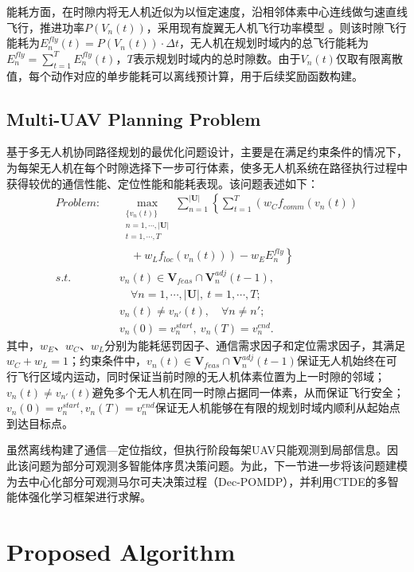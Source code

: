 \documentclass[lettersize,journal]{IEEEtran}
\begin{document}
能耗方面，在时隙内将无人机近似为以恒定速度，沿相邻体素中心连线做匀速直线飞行，推进功率$P(V_n(t))$，采用现有旋翼无人机飞行功率模型 \cite{ref17}。则该时隙飞行能耗为$E_n^{fly}(t)=P(V_n(t))\cdot\Delta t$，无人机在规划时域内的总飞行能耗为$E_n^{fly}=\sum_{t=1}^{T}E_n^{fly}(t)$，$T$表示规划时域内的总时隙数。由于$V_n(t)$仅取有限离散值，每个动作对应的单步能耗可以离线预计算，用于后续奖励函数构建。

\subsection{Multi-UAV Planning Problem}

基于多无人机协同路径规划的最优化问题设计，主要是在满足约束条件的情况下，为每架无人机在每个时隙选择下一步可行体素，使多无人机系统在路径执行过程中获得较优的通信性能、定位性能和能耗表现。该问题表述如下：
\begin{equation}
\begin{aligned}
\textit{Problem:}\quad & \max_{\substack{\{v_n(t)\}\\ n=1,\cdots,|\mathbf{U}|\\ t=1,\cdots,T}}
\sum_{n=1}^{|\mathbf{U}|}\left\{\sum_{t=1}^{T}\left(w_Cf_{comm}(v_n(t))\right.\right.\\
&\left.\left.\quad +w_Lf_{loc}(v_n(t))\right)-w_EE_n^{fly}\right\}\\
\textit{s.t.}\quad & v_n(t)\in\mathbf{V}_{feas}\cap\mathbf{V}_n^{adj}(t-1),\\
&\quad \forall n=1,\cdots,|\mathbf{U}|,\ t=1,\cdots,T;\\
& v_n(t)\ne v_{n'}(t),\quad \forall n\ne n';\\
& v_n(0)=v_n^{start},\ v_n(T)=v_n^{end}.
\end{aligned}
\end{equation}
其中，$w_E$、$w_C$、$w_L$分别为能耗惩罚因子、通信需求因子和定位需求因子，其满足$w_C+w_L=1$；约束条件中，$v_n(t)\in\mathbf{V}_{feas}\cap\mathbf{V}_n^{adj}(t-1)$保证无人机始终在可行飞行区域内运动，同时保证当前时隙的无人机体素位置为上一时隙的邻域；$v_n(t)\ne v_{n'}(t)$避免多个无人机在同一时隙占据同一体素，从而保证飞行安全；$v_n(0)=v_n^{start},v_n(T)=v_n^{end}$保证无人机能够在有限的规划时域内顺利从起始点到达目标点。

虽然离线构建了通信—定位指纹，但执行阶段每架UAV只能观测到局部信息。因此该问题为部分可观测多智能体序贯决策问题。为此，下一节进一步将该问题建模为去中心化部分可观测马尔可夫决策过程（Dec-POMDP），并利用CTDE的多智能体强化学习框架进行求解。

\section{Proposed Algorithm}
\end{document}
